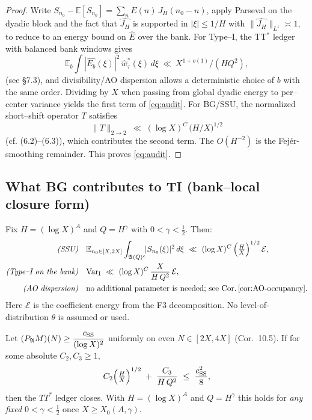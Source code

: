 \begin{proof}
Write $S_{n_0}-\mathbb E[S_{n_0}]=\sum_n E(n)\,J_H(n_0-n)$, apply Parseval on the dyadic block and the fact that $\widehat{J_H}$ is supported in $|\xi|\le 1/H$ with $\|\widehat{J_H}\|_{L^1}\asymp 1$, to reduce to an energy bound on $\widehat{E}$ over the bank. For Type–I, the TT$^\ast$ ledger with balanced bank windows gives
\[
\mathbb E_b\!\int |\widehat{E_b}(\xi)|^2\,\widehat{w}^{\ast}_{\tau}(\xi)\,d\xi
\ \ll\ X^{1+o(1)}/(H Q^2),
\]
(see §7.3), and divisibility/AO dispersion allows a deterministic choice of $b$ with the same order. Dividing by $X$ when passing from global dyadic energy to per–center variance yields the first term of \eqref{eq:audit}. For BG/SSU, the normalized short–shift operator $T$ satisfies
\[
\|T\|_{2\to2}\ \ll\ (\log X)^C\,\big(H/X\big)^{1/2}
\]
(cf. (6.2)–(6.3)), which contributes the second term. The $O(H^{-2})$ is the Fejér-smoothing remainder. This proves \eqref{eq:audit}.
\end{proof}


\subsection{What BG contributes to TI (bank--local closure form)}
\begin{proposition}\label{prop:BG-AO-ledger}
Fix $H=(\log X)^A$ and $Q=H^\gamma$ with $0<\gamma<\tfrac12$. Then:
\begin{align}
\text{\emph{(SSU)}}\quad &
\mathbb E_{n_0\in[X,2X]}\int_{\mathfrak A(Q)^c}\!\!|S_{n_0}(\xi)|^2\,d\xi
\ \ll\ (\log X)^C\,\Big(\tfrac{H}{X}\Big)^{1/2}\,\mathcal E, \\
\text{\emph{(Type--I on the bank)}}\quad &
\mathrm{Var}_{\mathrm I}\ \ll\ (\log X)^C\,\frac{X}{H\,Q^2}\,\mathcal E,\\
\text{\emph{(AO dispersion)}}\quad &
\text{no additional parameter is needed; see Cor.\,\ref{cor:AO-occupancy}.}
\end{align}
Here $\mathcal E$ is the coefficient energy from the F3 decomposition. No level-of-distribution $\theta$ is assumed or used.
\end{proposition}

\begin{corollary}\label{cor:bank-closure}
Let $(P_{\mathfrak A}M)(N)\ge \dfrac{c_{\rm SS}}{(\log X)^2}$ uniformly on even $N\in[2X,4X]$ (Cor.\ 10.5).
If for some absolute $C_2,C_3\ge1$,
\[
C_2\Big(\tfrac{H}{X}\Big)^{1/2}\;+\;\frac{C_3}{H\,Q^2}\ \le\ \frac{c_{\rm SS}^2}{8},
\]
then the $TT^\ast$ ledger closes. With $H=(\log X)^A$ and $Q=H^\gamma$ this holds for \emph{any fixed} $0<\gamma<\tfrac12$ once $X\ge X_0(A,\gamma)$.
\end{corollary}


